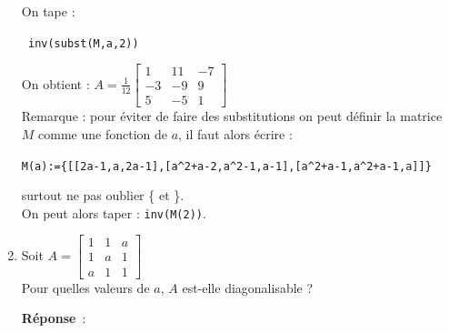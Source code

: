 \documentclass{article}
\begin{document}
\begin{giacjshere}
\begin{enumerate}
On tape :
\begin{center}
\verb| inv(subst(M,a,2))|
\end{center}
On obtient :
$A=\frac{1}{12}\left[ 
\begin{array}{ccc}
1 & 11 & -7\\
-3 & -9 & 9\\
5 & -5 & 1
\end{array}
\right]$\\
Remarque : pour \'eviter de faire des substitutions on peut d\'efinir la matrice $M$ comme une fonction de $a$, il faut alors \'ecrire :
\begin{center}
\verb|M(a):={[[2a-1,a,2a-1],[a^2+a-2,a^2-1,a-1],[a^2+a-1,a^2+a-1,a]]}|
\end{center}
surtout ne pas oublier \{ et \}.\\
On peut alors taper : \verb|inv(M(2))|.

\item Soit $A=\left[ 
\begin{array}{ccc}
1 & 1 & a\\
1 & a & 1\\
a & 1 & 1
\end{array}
\right]$\\
Pour quelles valeurs de $a$, $A$ est-elle diagonalisable ?

{\bf R\'eponse}~:\\


\end{enumerate}
\end{giacjshere}
\end{document}
